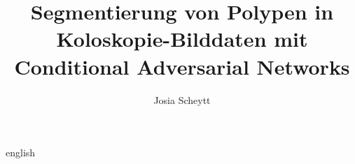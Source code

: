 

\title{Segmentierung von Polypen in Koloskopie-Bilddaten mit Conditional Adversarial Networks}
\author{Josia Scheytt}






\tableofcontents

\clearpage
{}
\begin{abstract}
	
\end{abstract}

\clearpage
{}
\begin{otherlanguage*}{english}
\begin{abstract}
	
\end{abstract}
\end{otherlanguage*}









\listoffigures
\listoftables
\printglossary[type=\acronymtype,title={Abkürzungsverzeichnis}]
\printbibliography[heading=bibintoc]



